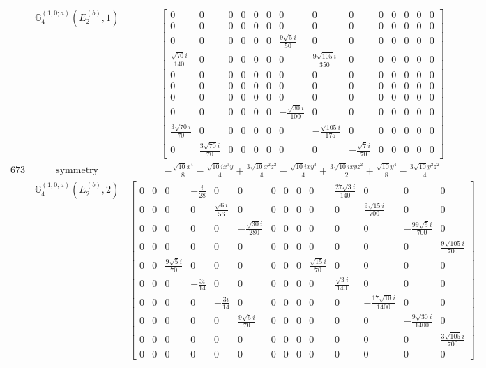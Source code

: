 \documentclass[fleqn,8pt,landscape]{jsarticle}
\begin{document}
\begin{longtable}{ccc}
$  $ & $ \mathbb{G}_{4}^{(1,0;a)}(E_{2}^{(b)},1) $ & $ \begin{bmatrix} 0 & 0 & 0 & 0 & 0 & 0 & 0 & 0 & 0 & 0 & 0 & 0 & 0 & 0 \\ 0 & 0 & 0 & 0 & 0 & 0 & 0 & 0 & 0 & 0 & 0 & 0 & 0 & 0 \\ 0 & 0 & 0 & 0 & 0 & 0 & \frac{9 \sqrt{5} i}{50} & 0 & 0 & 0 & 0 & 0 & 0 & 0 \\ \frac{\sqrt{70} i}{140} & 0 & 0 & 0 & 0 & 0 & 0 & \frac{9 \sqrt{105} i}{350} & 0 & 0 & 0 & 0 & 0 & 0 \\ 0 & 0 & 0 & 0 & 0 & 0 & 0 & 0 & 0 & 0 & 0 & 0 & 0 & 0 \\ 0 & 0 & 0 & 0 & 0 & 0 & 0 & 0 & 0 & 0 & 0 & 0 & 0 & 0 \\ 0 & 0 & 0 & 0 & 0 & 0 & 0 & 0 & 0 & 0 & 0 & 0 & 0 & 0 \\ 0 & 0 & 0 & 0 & 0 & 0 & - \frac{\sqrt{30} i}{100} & 0 & 0 & 0 & 0 & 0 & 0 & 0 \\ \frac{3 \sqrt{70} i}{70} & 0 & 0 & 0 & 0 & 0 & 0 & - \frac{\sqrt{105} i}{175} & 0 & 0 & 0 & 0 & 0 & 0 \\ 0 & \frac{3 \sqrt{70} i}{70} & 0 & 0 & 0 & 0 & 0 & 0 & - \frac{\sqrt{7} i}{70} & 0 & 0 & 0 & 0 & 0 \end{bmatrix} $ \\ \hline
$ 673 $ & $ \text{symmetry} $ & $ - \frac{\sqrt{10} x^{4}}{8} - \frac{\sqrt{10} i x^{3} y}{4} + \frac{3 \sqrt{10} x^{2} z^{2}}{4} - \frac{\sqrt{10} i x y^{3}}{4} + \frac{3 \sqrt{10} i x y z^{2}}{2} + \frac{\sqrt{10} y^{4}}{8} - \frac{3 \sqrt{10} y^{2} z^{2}}{4} $ \\
$  $ & $ \mathbb{G}_{4}^{(1,0;a)}(E_{2}^{(b)},2) $ & $ \begin{bmatrix} 0 & 0 & 0 & - \frac{i}{28} & 0 & 0 & 0 & 0 & 0 & 0 & \frac{27 \sqrt{3} i}{140} & 0 & 0 & 0 \\ 0 & 0 & 0 & 0 & \frac{\sqrt{6} i}{56} & 0 & 0 & 0 & 0 & 0 & 0 & \frac{9 \sqrt{15} i}{700} & 0 & 0 \\ 0 & 0 & 0 & 0 & 0 & - \frac{\sqrt{30} i}{280} & 0 & 0 & 0 & 0 & 0 & 0 & - \frac{99 \sqrt{5} i}{700} & 0 \\ 0 & 0 & 0 & 0 & 0 & 0 & 0 & 0 & 0 & 0 & 0 & 0 & 0 & \frac{9 \sqrt{105} i}{700} \\ 0 & 0 & \frac{9 \sqrt{5} i}{70} & 0 & 0 & 0 & 0 & 0 & 0 & \frac{\sqrt{15} i}{70} & 0 & 0 & 0 & 0 \\ 0 & 0 & 0 & - \frac{3 i}{14} & 0 & 0 & 0 & 0 & 0 & 0 & \frac{\sqrt{3} i}{140} & 0 & 0 & 0 \\ 0 & 0 & 0 & 0 & - \frac{3 i}{14} & 0 & 0 & 0 & 0 & 0 & 0 & - \frac{17 \sqrt{10} i}{1400} & 0 & 0 \\ 0 & 0 & 0 & 0 & 0 & \frac{9 \sqrt{5} i}{70} & 0 & 0 & 0 & 0 & 0 & 0 & - \frac{9 \sqrt{30} i}{1400} & 0 \\ 0 & 0 & 0 & 0 & 0 & 0 & 0 & 0 & 0 & 0 & 0 & 0 & 0 & \frac{3 \sqrt{105} i}{700} \\ 0 & 0 & 0 & 0 & 0 & 0 & 0 & 0 & 0 & 0 & 0 & 0 & 0 & 0 \end{bmatrix} $ \\ \hline

\end{longtable}
\end{document}
